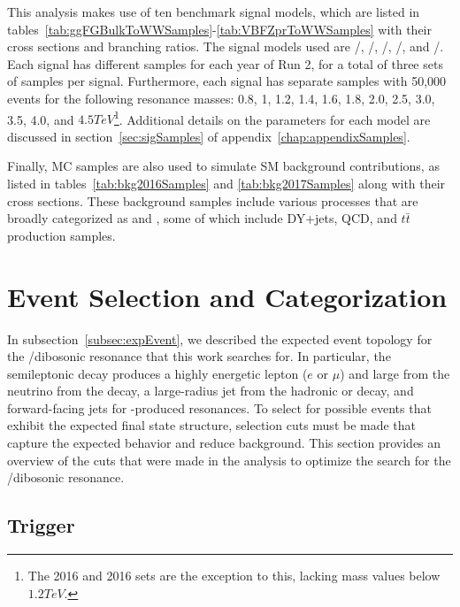 This analysis makes use of ten benchmark signal models, which are listed in tables~\ref{tab:ggFGBulkToWWSamples}-\ref{tab:VBFZprToWWSamples} with their cross sections and branching ratios.
The signal models used are \ggF/\VBF\GBulktoWWtolnuqqbarpr, \ggF/\VBF\RadtoWWtolnuqqbarpr, \DY/\VBF\WprtoWZtolnuqqbar, \DY/\VBF\WprtoWHtolnubbbar, and \DY/\VBF\ZprtoWWtolnuqqbarpr.
Each signal has different samples for each year of Run 2, for a total of three sets of samples per signal.
Furthermore, each signal has separate samples with 50,000 events for the following resonance masses: 0.8, 1, 1.2, 1.4, 1.6, 1.8, 2.0, 2.5, 3.0, 3.5, 4.0, and $4.5\unit{TeV}$\footnote{The 2016 \VBF\ZprtoWW and 2016 \VBF\WprtoWZ sets are the exception to this, lacking mass values below $1.2\unit{TeV}$.}.
Additional details on the parameters for each model are discussed in section~\ref{sec:sigSamples} of appendix~\ref{chap:appendixSamples}.

Finally, MC samples are also used to simulate SM background contributions, as listed in tables~\ref{tab:bkg2016Samples} and \ref{tab:bkg2017Samples} along with their cross sections.
These background samples include various processes that are broadly categorized as \Wjets and \WVt, some of which include DY+jets, QCD, and $t\bar{t}$ production samples.

\section{Event Selection and Categorization}
\label{sec:events}

In subsection~\ref{subsec:expEvent}, we described the expected event topology for the \WV/\WH dibosonic resonance that this work searches for.
In particular, the semileptonic decay produces a highly energetic lepton ($e$ or $\mu$) and large \Etmiss from the neutrino from the \Wtolnu decay, a large-radius jet from the hadronic \Vtoqqbarpr or \Htobbbar decay, and forward-facing \VBF jets for \VBF-produced resonances.
To select for possible events that exhibit the expected final state structure, selection cuts must be made that capture the expected behavior and reduce background.
This section provides an overview of the cuts that were made in the analysis to optimize the search for the \WV/\WH dibosonic resonance.

\subsection{Trigger}

